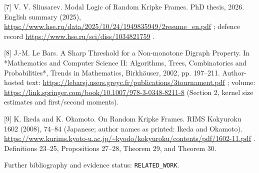 \documentclass[11pt]{article}
\begin{document}
[7] V. V. Sliusarev. Modal Logic of Random Kripke Frames. PhD thesis, 2026. English summary (2025), \url{https://www.hse.ru/data/2025/10/24/1949835949/2resume_en.pdf} ; defence record \url{https://www.hse.ru/sci/diss/1034821759} .

[8] J.-M. Le Bars. A Sharp Threshold for a Non-monotone Digraph Property. In *Mathematics and Computer Science II: Algorithms, Trees, Combinatorics and Probabilities*, Trends in Mathematics, Birkhäuser, 2002, pp. 197--211. Author-hosted text: \url{https://lebarsj.users.greyc.fr/publications/3tournament.pdf} ; volume: \url{https://link.springer.com/book/10.1007/978-3-0348-8211-8} (Section 2, kernel size estimates and first/second moments).

[9] K. Ikeda and K. Okamoto. On Random Kripke Frames. RIMS Kokyuroku 1602 (2008), 74--84 (Japanese; author names as printed: Ikeda and Okamoto). \url{https://www.kurims.kyoto-u.ac.jp/~kyodo/kokyuroku/contents/pdf/1602-11.pdf} . Definitions 23--25, Propositions 27--28, Theorem 29, and Theorem 30.

Further bibliography and evidence status: \texttt{RELATED\_WORK}.
\end{document}
